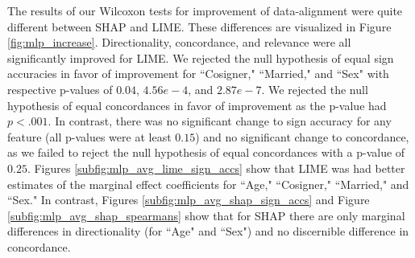 \documentclass[mnsc,blindrev]{informs3}
\begin{document}
            The results of our Wilcoxon tests for improvement of data-alignment were quite different between SHAP and LIME. These differences are visualized in Figure \ref{fig:mlp_increase}. Directionality, concordance, and relevance were all significantly improved for LIME. We rejected the null hypothesis of equal sign accuracies in favor of improvement for ``Cosigner," ``Married," and ``Sex" with respective p-values of $0.04$, $4.56e-4$, and $2.87e-7$. We rejected the null hypothesis of equal concordances in favor of improvement as the p-value had $p<.001$. In contrast, there was no significant change to sign accuracy for any feature (all p-values were at least $0.15$) and no significant change to concordance, as we failed to reject the null hypothesis of equal concordances with a p-value of $0.25$. Figures \ref{subfig:mlp_avg_lime_sign_accs} show that LIME was had better estimates of the marginal effect coefficients for ``Age," ``Cosigner," ``Married," and ``Sex."  In contrast, Figures \ref{subfig:mlp_avg_shap_sign_accs} and Figure \ref{subfig:mlp_avg_shap_spearmans} show that for SHAP there are only marginal differences in directionality (for ``Age" and ``Sex") and no discernible difference in concordance. %
            
            

    
\end{document}
